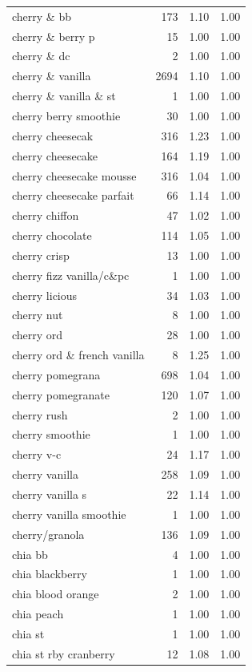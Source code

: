 \begin{table}
\begin{tabular}{lrrr}
cherry \& bb & 173 & 1.10 & 1.00 \\
cherry \& berry p & 15 & 1.00 & 1.00 \\
cherry \& dc & 2 & 1.00 & 1.00 \\
cherry \& vanilla & 2694 & 1.10 & 1.00 \\
cherry \& vanilla \& st & 1 & 1.00 & 1.00 \\
cherry berry smoothie & 30 & 1.00 & 1.00 \\
cherry cheesecak & 316 & 1.23 & 1.00 \\
cherry cheesecake & 164 & 1.19 & 1.00 \\
cherry cheesecake mousse & 316 & 1.04 & 1.00 \\
cherry cheesecake parfait & 66 & 1.14 & 1.00 \\
cherry chiffon & 47 & 1.02 & 1.00 \\
cherry chocolate & 114 & 1.05 & 1.00 \\
cherry crisp & 13 & 1.00 & 1.00 \\
cherry fizz vanilla/c\&pc & 1 & 1.00 & 1.00 \\
cherry licious & 34 & 1.03 & 1.00 \\
cherry nut & 8 & 1.00 & 1.00 \\
cherry ord & 28 & 1.00 & 1.00 \\
cherry ord \& french vanilla & 8 & 1.25 & 1.00 \\
cherry pomegrana & 698 & 1.04 & 1.00 \\
cherry pomegranate & 120 & 1.07 & 1.00 \\
cherry rush & 2 & 1.00 & 1.00 \\
cherry smoothie & 1 & 1.00 & 1.00 \\
cherry v-c & 24 & 1.17 & 1.00 \\
cherry vanilla & 258 & 1.09 & 1.00 \\
cherry vanilla s & 22 & 1.14 & 1.00 \\
cherry vanilla smoothie & 1 & 1.00 & 1.00 \\
cherry/granola & 136 & 1.09 & 1.00 \\
chia bb & 4 & 1.00 & 1.00 \\
chia blackberry & 1 & 1.00 & 1.00 \\
chia blood orange & 2 & 1.00 & 1.00 \\
chia peach & 1 & 1.00 & 1.00 \\
chia st & 1 & 1.00 & 1.00 \\
chia st rby cranberry & 12 & 1.08 & 1.00 \\

\end{tabular}
\end{table}
